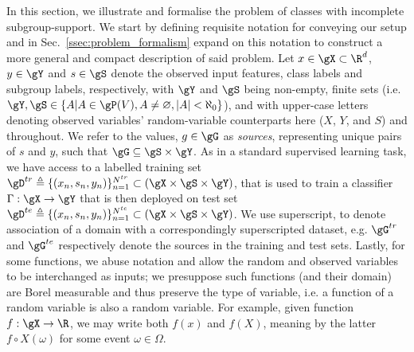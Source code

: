 In this section, we illustrate and formalise the problem of classes with incomplete
subgroup-support. 
%
We start by defining requisite notation for conveying our setup and in
Sec.~\ref{ssec:problem_formalism} expand on this notation to construct a more general and compact
description of said problem. 
%
Let \( x \in \gX \subset \R^d \), \( y \in \gY \) and \( s \in \gS \) denote the observed input
features, class labels and subgroup labels, respectively, with \( \gY \) and \( \gS \) being
non-empty, finite sets (i.e. \( \gY, \gS \in \{ A | A \in \gP(V), A \neq \varnothing, |A| <
\aleph_0 \} \)), and with upper-case letters denoting observed variables' random-variable
counterparts here (\(X\), \(Y\), and \(S\)) and throughout.
%
We refer to the values, \( g \in \gG \) as \emph{sources}, representing unique pairs of \( s \) and
\( y \), such that \(  \gG \subseteq \gS \times \gY \). 
%
As in a standard supervised learning task, we have access to a labelled training set \( \gD^{tr}
\triangleq \{ (x_n, s_n, y_n) \}_{n=1}^{N^{tr}} \subset (\gX \times \gS \times \gY) \), that is used to
train a classifier \( \Gamma:\gX \rightarrow \gY \) that is then deployed on test set \( \gD^{te}
\triangleq \{ (x_n, s_n, y_n) \}_{n=1}^{N^{te}} \subset (\gX \times \gS \times \gY) \). 
%
We use superscript, to denote association of a domain with a correspondingly superscripted dataset,
e.g. \( \gG^{tr} \) and \( \gG^{te} \) respectively denote the sources in the training and test
sets.
%
Lastly, for some functions, we abuse notation and allow the random and observed variables to be
interchanged as inputs; we presuppose such functions (and their domain) are Borel measurable and
thus preserve the type of variable, i.e. a function of a random variable is also a random variable.
%
For example, given function \(f: \gX \to \R \), we may write both \( f(x) \) and \( f(X) \),
meaning by the latter \( f \circ X(\omega) \) for some event \( \omega \in \Omega \).
%
